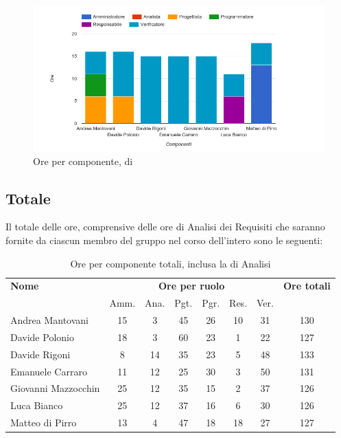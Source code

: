     \begin{figure}[H]
      \begin{center}
        \includegraphics[width=15cm]{res/img/suddivisioneRuoloProspettoOrario/orePerComponenteValidazione.png}
      \caption{Ore per componente,  di }
      \end{center} 
    \end{figure}    
   
    
    
\pagebreak
\subsection{Totale}
Il totale delle ore, comprensive delle ore di Analisi dei Requisiti che saranno fornite da ciascun membro
del gruppo nel corso dell’intero  sono le seguenti:

\begin{table}[H]
\begin{tabular}{lccccccc}
\toprule
    \textbf{Nome}  & \multicolumn{6}{c}{\textbf{Ore per ruolo}} & \textbf{Ore totali} \\
     & Amm. & Ana. & Pgt. & Pgr. & Res. & Ver. & \\
    \midrule
   
	   Andrea Mantovani & 15 & 3 & 45 & 26 & 10 & 31 & 130 \\
	     Davide Polonio & 18 & 3 & 60 & 23 & 1 & 22 & 127 \\
	      Davide Rigoni & 8 & 14 & 35 & 23 & 5 & 48 & 133 \\
	   Emanuele Carraro & 11 & 12 & 25 & 30 & 3 & 50 & 131 \\
	Giovanni Mazzocchin & 25 & 12 & 35 & 15 & 2 & 37 & 126 \\ 
	        Luca Bianco & 25 & 12 & 37 & 16 & 6 & 30 & 126 \\ 
	    Matteo di Pirro & 13 & 4 & 47 & 18 & 18 & 27 & 127 \\ 
   
    \bottomrule
\end{tabular}
\caption{Ore per componente totali, inclusa la  di Analisi}
\end{table}

